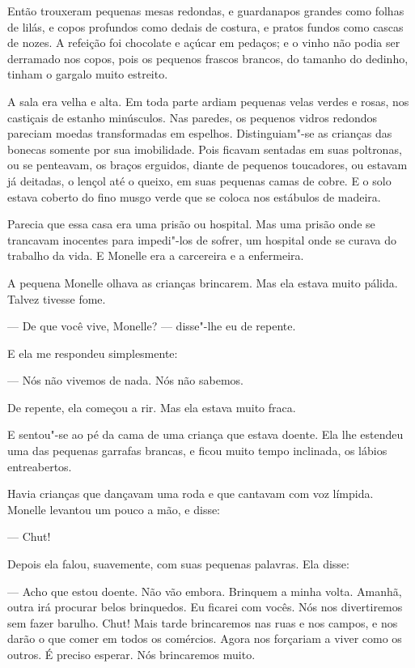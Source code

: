 Então trouxeram pequenas mesas redondas, e guardanapos grandes
como folhas de lilás, e copos profundos como dedais de costura, e pratos
fundos como cascas de nozes. A refeição foi chocolate e açúcar em pedaços;
e o vinho não podia ser derramado nos copos, pois os pequenos frascos
brancos, do tamanho do dedinho, tinham o gargalo muito estreito.

A sala era velha e alta. Em toda parte ardiam pequenas velas verdes e
rosas, nos castiçais de estanho minúsculos. Nas paredes, os pequenos
vidros redondos pareciam moedas transformadas em espelhos. Distinguiam"-se
as crianças das bonecas somente por sua imobilidade. Pois ficavam sentadas
em suas poltronas, ou se penteavam, os braços erguidos, diante de pequenos
toucadores, ou estavam já deitadas, o lençol até o queixo, em suas
pequenas camas de cobre. E o solo estava coberto do fino musgo verde que
se coloca nos estábulos de madeira.

Parecia que essa casa era uma prisão ou hospital. Mas uma prisão onde
se trancavam inocentes para impedi"-los de sofrer, um hospital onde se
curava do trabalho da vida. E Monelle era a carcereira e a enfermeira.

A pequena Monelle olhava as crianças brincarem. Mas ela estava muito
pálida. Talvez tivesse fome.

--- De que você vive, Monelle? --- disse"-lhe eu de repente.

E ela me respondeu simplesmente:

--- Nós não vivemos de nada. Nós não sabemos.

De repente, ela começou a rir. Mas ela estava muito fraca.

E sentou"-se ao pé da cama de uma criança que estava doente. Ela lhe
estendeu uma das pequenas garrafas brancas, e ficou muito tempo inclinada,
os lábios entreabertos.


Havia crianças que dançavam uma roda e que cantavam com voz límpida.
Monelle levantou um pouco a mão, e disse:

--- Chut!

Depois ela falou, suavemente, com suas pequenas palavras. Ela disse:

--- Acho que estou doente. Não vão embora. Brinquem a minha volta.
Amanhã, outra irá procurar belos brinquedos. Eu ficarei com vocês. Nós nos
divertiremos sem fazer barulho. Chut! Mais tarde brincaremos nas ruas e
nos campos, e nos darão o que comer em todos os comércios. Agora nos
forçariam a viver como os outros. É preciso esperar. Nós brincaremos muito.

